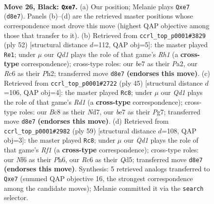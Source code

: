 \documentclass[11pt]{article}
\begin{document}
\clearpage

\begin{figure}[p]\centering
\begin{subfigure}{0.46\textwidth}\centering
\resizebox{\linewidth}{!}{%
\newchessgame
\chessboard[
  setfen={2bq1k2/Q1p1Bp1p/P1r2n2/3p2N1/5P2/8/2P3P1/R4RK1 b - - 0 26},
  showmover=false,
  pgfstyle=straightmove, color=movearrow, markmove={d8-e7}
]}
\caption{}
\end{subfigure}\hfill
\begin{subfigure}{0.46\textwidth}\centering
\resizebox{\linewidth}{!}{%
\newchessgame
\chessboard[
  setfen={2k1r2r/pp6/2p1p3/4q2p/8/Q3B3/PPP1BnPP/1K5R w - - 2 27},
  showmover=false,
  pgfstyle=straightmove, color=movearrow, markmove={h1-e1}
]}
\caption{}
\end{subfigure}
\\[4pt]
\begin{subfigure}{0.46\textwidth}\centering
\resizebox{\linewidth}{!}{%
\newchessgame
\chessboard[
  setfen={3r2k1/3nqpp1/8/Q1p4N/3p3P/Pr4P1/4PP2/2R2RK1 b - - 0 23},
  showmover=false,
  pgfstyle=straightmove, color=movearrow, markmove={d8-c8}
]}
\caption{}
\end{subfigure}\hfill
\begin{subfigure}{0.46\textwidth}\centering
\resizebox{\linewidth}{!}{%
\newchessgame
\chessboard[
  setfen={5r1k/5pp1/1p5p/3qnN2/1Q6/6RP/r4PP1/1R4K1 b - - 3 30},
  showmover=false,
  pgfstyle=straightmove, color=movearrow, markmove={f8-c8}
]}
\caption{}
\end{subfigure}
\caption{\textbf{Move 26, Black: \texttt{Qxe7}.} (a) Our position; Melanie plays \texttt{Qxe7} (\texttt{d8e7}). Panels (b)--(d) are the retrieved master positions whose correspondence most drove this move (highest QAP objective among those that transfer to it). (b) Retrieved from \texttt{ccrl\_top\_p0001\#3829} (ply 52) [structural distance $d$=112, QAP obj=5]: the master played \texttt{Re1}; under $\mu$ our \emph{Qd1} plays the role of that game's \emph{Rh1} (a \textbf{cross-type} correspondence); cross-type roles: our \emph{b}e7 as their \emph{P}a2, our \emph{R}c6 as their \emph{P}h2; transferred move \texttt{d8e7} \textbf{(endorses this move)}. (c) Retrieved from \texttt{ccrl\_top\_p0001\#2722} (ply 45) [structural distance $d$=106, QAP obj=4]: the master played \texttt{Rc8}; under $\mu$ our \emph{Qd1} plays the role of that game's \emph{Rd1} (a \textbf{cross-type} correspondence); cross-type roles: our \emph{B}c8 as their \emph{N}d7, our \emph{b}e7 as their \emph{P}g7; transferred move \texttt{d8e7} \textbf{(endorses this move)}. (d) Retrieved from \texttt{ccrl\_top\_p0001\#2982} (ply 59) [structural distance $d$=108, QAP obj=3]: the master played \texttt{Rc8}; under $\mu$ our \emph{Qd1} plays the role of that game's \emph{Rf1} (a \textbf{cross-type} correspondence); cross-type roles: our \emph{N}f6 as their \emph{P}h6, our \emph{R}c6 as their \emph{Q}d5; transferred move \texttt{d8e7} \textbf{(endorses this move)}. Synthesis: 5 retrieved analogs transferred to \texttt{Qxe7} (summed QAP objective 16, the strongest correspondence among the candidate moves); Melanie committed it via the \texttt{search} selector.}
\label{fig:thought-m51}
\end{figure}
\end{document}
